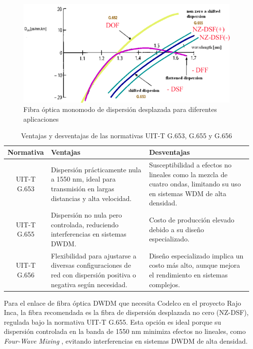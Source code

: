 \begin{enumerate}
	\begin{figure}
		\centering
		\includegraphics[width=0.7\linewidth]{img/Figure_1_1}
		\caption{Fibra óptica monomodo de dispersión desplazada para diferentes aplicaciones}
		\label{fig:2}
	\end{figure}
	
	\begin{table}[H]
		\centering
		\begin{tabular}{|c|p{6cm}|p{6cm}|}
		\hline
		\textbf{Normativa} & \textbf{Ventajas} & \textbf{Desventajas} \\
		\hline
		UIT-T G.653 & 
		Dispersión prácticamente nula a 1550 nm, ideal para transmisión en largas distancias y alta velocidad. & 
		Susceptibilidad a efectos no lineales como la mezcla de cuatro ondas, limitando su uso en sistemas WDM de alta densidad. \\
		\hline
		UIT-T G.655 & 
		Dispersión no nula pero controlada, reduciendo interferencias en sistemas DWDM. & 
		Costo de producción elevado debido a su diseño especializado. \\
		\hline
		UIT-T G.656 & 
		Flexibilidad para ajustarse a diversas configuraciones de red con dispersión positiva o negativa según necesidad. & 
		Diseño especializado implica un costo más alto, aunque mejora el rendimiento en sistemas complejos. \\
		\hline
		\end{tabular}
		\caption{Ventajas y desventajas de las normativas UIT-T G.653, G.655 y G.656}
	\end{table}
	
	Para el enlace de fibra óptica DWDM que necesita Codelco en el proyecto Rajo Inca, la fibra recomendada es la fibra de dispersión desplazada no cero (NZ-DSF), regulada bajo la normativa UIT-T G.655. Esta opción es ideal porque su dispersión controlada en la banda de 1550 nm minimiza efectos no lineales, como \textit{Four-Wave Mixing }, evitando interferencias en sistemas DWDM de alta densidad.
	

\end{enumerate}
